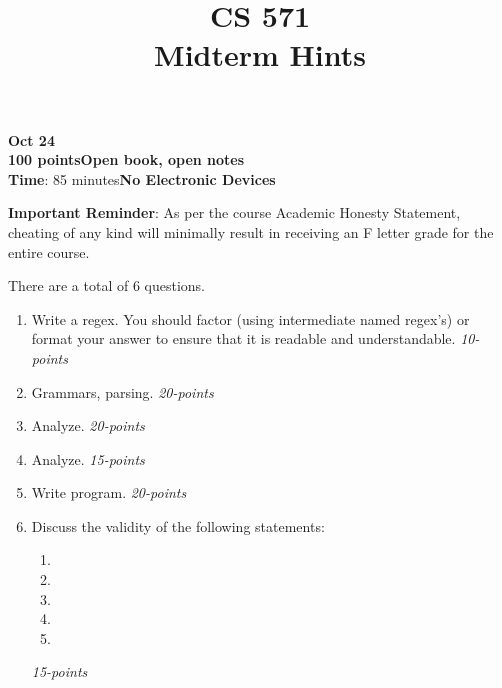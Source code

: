 \documentclass[12pt]{article}
\title{CS 571\\Midterm Hints}
\date{}
\begin{document}
\maketitle

\begin{flushleft}
\textbf{Oct 24}\\
\textbf{100 points}\hfill\textbf{Open book, open notes}\\
\textbf{Time}: 85 minutes\hfill\textbf{No Electronic Devices}\\

\vspace{0.5cm}

\textbf{Important Reminder}: As per the course Academic Honesty
Statement, cheating of any kind will minimally result in receiving an
F letter grade for the entire course.


\end{flushleft}

There are a total of 6 questions.

\begin{enumerate}

\item Write a regex.
  You should factor (using
  intermediate named regex's) or format your answer to ensure that
  it is readable and understandable.
  \hfill{\textit{10-points}}
  

\item Grammars, parsing.  \hfill\textit{20-points}
  
\item Analyze.  \hfill\textit{20-points}

\item Analyze. \hfill\textit{15-points}

\item Write program. \hfill\textit{20-points}

\item Discuss the validity of the following statements:

  \begin{enumerate}

  \item 

  \item 

  \item 

  \item 

  \item 
    

  \end{enumerate} \hfill\textit{15-points}

\end{enumerate}
\end{document}
